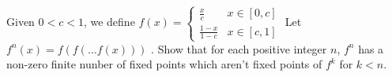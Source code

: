 Given \( 0< c< 1\), we define $f(x) =
 \begin{cases}
 \frac{x}{c} & x  \in [0,c] \\
 \frac{1-x}{1-c} & x \in [c, 1]
\end{cases}   
$
Let \(f^{n}(x)=f(f(\dots f(x)))\) . Show that for each positive integer \(n\), \(f^{n}\) has a non-zero finite nunber of fixed points which aren't fixed points of \(f^k\) for \(k<   n\).